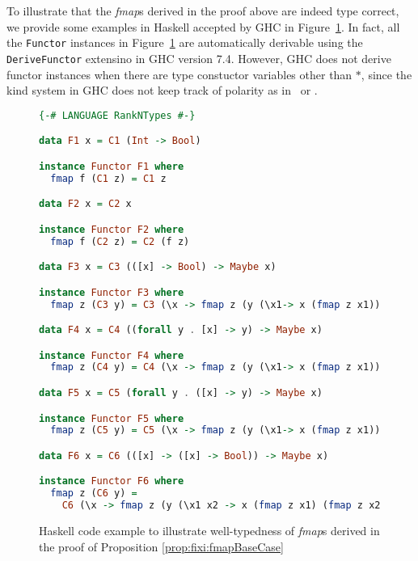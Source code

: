 To illustrate that the \textit{fmap}s derived in the proof above are indeed
type correct, we provide some examples in Haskell accepted by GHC in
Figure~\ref{fig:deriveFunctor}. In fact, all the \texttt{\small Functor}
instances in Figure~\ref{fig:deriveFunctor} are automatically derivable
using the \texttt{\small DeriveFunctor} extensino in GHC version 7.4.
However, GHC does not derive functor instances when there are
type constuctor variables other than $*$, since the kind system in GHC
does not keep track of polarity as in \Fixw\ or \Fixi.
\begin{figure}
\begin{singlespace}
\begin{lstlisting}[basicstyle={\ttfamily\small},language=Haskell,mathescape]
{-# LANGUAGE RankNTypes #-}

data F1 x = C1 (Int -> Bool)

instance Functor F1 where
  fmap f (C1 z) = C1 z

data F2 x = C2 x

instance Functor F2 where
  fmap f (C2 z) = C2 (f z)

data F3 x = C3 (([x] -> Bool) -> Maybe x)

instance Functor F3 where
  fmap z (C3 y) = C3 (\x -> fmap z (y (\x1-> x (fmap z x1))))

data F4 x = C4 ((forall y . [x] -> y) -> Maybe x)

instance Functor F4 where
  fmap z (C4 y) = C4 (\x -> fmap z (y (\x1-> x (fmap z x1))))

data F5 x = C5 (forall y . ([x] -> y) -> Maybe x)

instance Functor F5 where
  fmap z (C5 y) = C5 (\x -> fmap z (y (\x1-> x (fmap z x1))))

data F6 x = C6 (([x] -> ([x] -> Bool)) -> Maybe x)

instance Functor F6 where
  fmap z (C6 y) =
    C6 (\x -> fmap z (y (\x1 x2 -> x (fmap z x1) (fmap z x2))))
\end{lstlisting}
\end{singlespace}
\caption{Haskell code example to illustrate well-typedness of \textit{fmap}s
        derived in the proof of Proposition \ref{prop:fixi:fmapBaseCase}}
\label{fig:deriveFunctor}
\end{figure}

